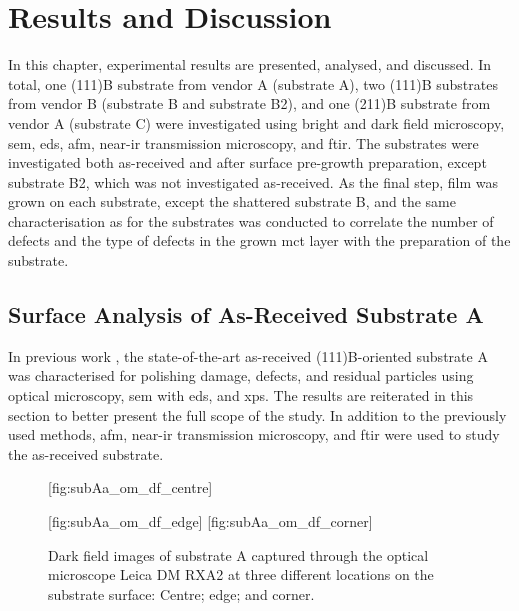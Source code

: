 \chapter{Results and Discussion}\label{ch:results-and-discussion}
In this chapter, experimental results are presented, analysed, and discussed. In total, one (111)B substrate from vendor A (substrate A), two (111)B substrates from vendor B (substrate B and substrate B2), and one (211)B substrate from vendor A (substrate C) were investigated using bright and dark field microscopy, \ac{sem}, \ac{eds}, \ac{afm}, near-\ac{ir} transmission microscopy, and \ac{ftir}. The substrates were investigated both as-received and after surface pre-growth preparation, except substrate B2, which was not investigated as-received. As the final step,  film was grown on each substrate, except the shattered substrate B, and the same characterisation as for the substrates was conducted to correlate the number of defects and the type of defects in the grown \ac{mct} layer with the preparation of the substrate.
\section{Surface Analysis of As-Received Substrate A}\label{sec:subAa}
In previous work \citep{lauten2017characterisation}, the state-of-the-art as-received (111)B-oriented substrate A was characterised for polishing damage, defects, and residual particles using optical microscopy, \ac{sem} with \ac{eds}, and \ac{xps}. The results are reiterated in this section to better present the full scope of the study. In addition to the previously used methods, \ac{afm}, near-\ac{ir} transmission microscopy, and \ac{ftir} were used to study the as-received substrate.


\begin{figure}[htbp]
    \centering
    [fig:subAa_om_df_centre]
    \par\bigskip
    [fig:subAa_om_df_edge]
    \hfill
    [fig:subAa_om_df_corner]
    \caption[Dark field images of substrate A.]{Dark field images of substrate A captured through the optical microscope Leica DM RXA2 at three different locations on the substrate surface:  Centre;  edge; and  corner.}
    \label{fig:subAa_om_df}
\end{figure}

